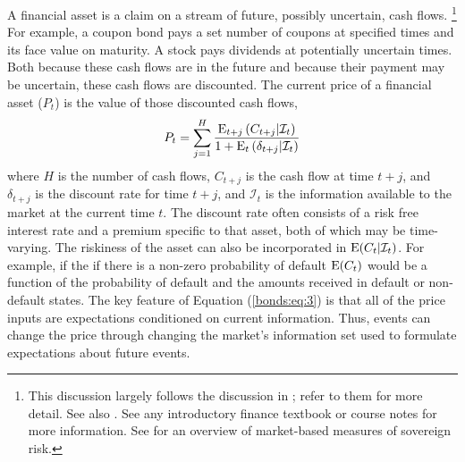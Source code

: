 A financial asset is a claim on a stream of future, possibly uncertain, cash flows.%
\footnote{
  This discussion largely follows the discussion in \textcite[673]{GuidolinLaFerrara2010}; refer to them for more detail.
  See also \textcite{HaberMitchenerOosterlinckEtAl2015}.
  See any introductory finance textbook or course notes for more information.
  See \textcite{Chan-Lau2006} for an overview of market-based measures of sovereign risk.
}
For example, a coupon bond pays a set number of coupons at specified times and its face value on maturity.
A stock pays dividends at potentially uncertain times.
Both because these cash flows are in the future and because their payment may be uncertain, these cash flows are discounted.
The current price of a financial asset ($P_{t}$) is the value of those discounted cash flows,
\begin{equation}
  \label{bonds:eq:3}
  P_{t} = \sum_{j = 1}^{H} \frac{\operatorname{E}_{t + j}\left(C_{t + j} | \mathcal{I}_{t}\right)}{1 + \operatorname{E}_{t}\left(\delta_{t+j} | \mathcal{I}_{t}\right)}
\end{equation}
where $H$ is the number of cash flows, $C_{t + j}$ is the cash flow at time $t + j$, and $\delta_{t + j}$ is the discount rate for time $t + j$, and $\mathcal{I}_{t}$ is the information available to the market at the current time $t$.
The discount rate often consists of a risk free interest rate and a premium specific to that asset, both of which may be time-varying.
The riskiness of the asset can also be incorporated in $\operatorname{E}(C_{t}| \mathcal{I}_{t})$.
For example, if the if there is a non-zero probability of default $\operatorname{E}(C_{t})$ would be a function of the probability of default and the amounts received in default or non-default states.
The key feature of Equation (\ref{bonds:eq:3}) is that all of the price inputs are expectations conditioned on current information.
Thus, events can change the price through changing the market's information set used to formulate expectations about future events. 

